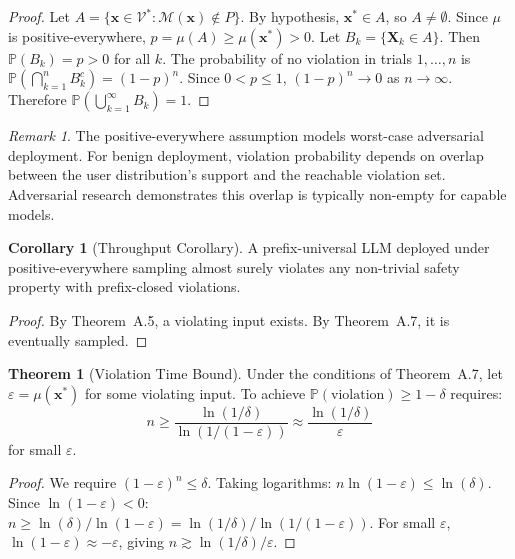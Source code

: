 \documentclass[11pt]{article}
\theoremstyle{definition}
\newtheorem{theorem}{Theorem}[section]
\newtheorem{corollary}{Corollary}[theorem]
\theoremstyle{remark}
\newtheorem{remark}{Remark}[section]
\begin{document}
\begin{proof}
Let $A = \{\mathbf{x} \in \mathcal{V}^* : \mathcal{M}(\mathbf{x}) \notin P\}$. By hypothesis, $\mathbf{x}^* \in A$, so $A \neq \emptyset$. Since $\mu$ is positive-everywhere, $p = \mu(A) \geq \mu(\mathbf{x}^*) > 0$. Let $B_k = \{\mathbf{X}_k \in A\}$. Then $\mathbb{P}(B_k) = p > 0$ for all $k$. The probability of no violation in trials $1, \ldots, n$ is $\mathbb{P}(\bigcap_{k=1}^n B_k^c) = (1-p)^n$. Since $0 < p \leq 1$, $(1-p)^n \to 0$ as $n \to \infty$. Therefore $\mathbb{P}(\bigcup_{k=1}^\infty B_k) = 1$.
\end{proof}

\begin{remark}
The positive-everywhere assumption models worst-case adversarial deployment. For benign deployment, violation probability depends on overlap between the user distribution's support and the reachable violation set. Adversarial research demonstrates this overlap is typically non-empty for capable models.
\end{remark}

\begin{corollary}[Throughput Corollary]
A prefix-universal LLM deployed under positive-everywhere sampling almost surely violates any non-trivial safety property with prefix-closed violations.
\end{corollary}

\begin{proof}
By Theorem~A.5, a violating input exists. By Theorem~A.7, it is eventually sampled.
\end{proof}

\begin{theorem}[Violation Time Bound]
Under the conditions of Theorem~A.7, let $\varepsilon = \mu(\mathbf{x}^*)$ for some violating input. To achieve $\mathbb{P}(\text{violation}) \geq 1 - \delta$ requires:
\begin{equation}
n \geq \frac{\ln(1/\delta)}{\ln(1/(1-\varepsilon))} \approx \frac{\ln(1/\delta)}{\varepsilon}
\end{equation}
for small $\varepsilon$.
\end{theorem}

\begin{proof}
We require $(1-\varepsilon)^n \leq \delta$. Taking logarithms: $n \ln(1-\varepsilon) \leq \ln(\delta)$. Since $\ln(1-\varepsilon) < 0$: $n \geq \ln(\delta)/\ln(1-\varepsilon) = \ln(1/\delta)/\ln(1/(1-\varepsilon))$. For small $\varepsilon$, $\ln(1-\varepsilon) \approx -\varepsilon$, giving $n \gtrsim \ln(1/\delta)/\varepsilon$.
\end{proof}
\end{document}
